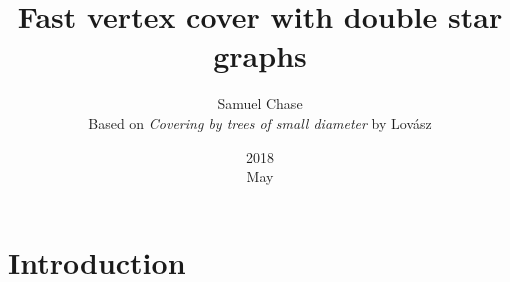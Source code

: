 \documentclass{article}
\title{Fast vertex cover with double star graphs}
\date{2018\\ May}
\author{Samuel Chase\\ Based on \textit{Covering by trees of small diameter} by Lov\'asz}
\begin{document}
	\maketitle
	\section{Introduction}
	
\end{document}
